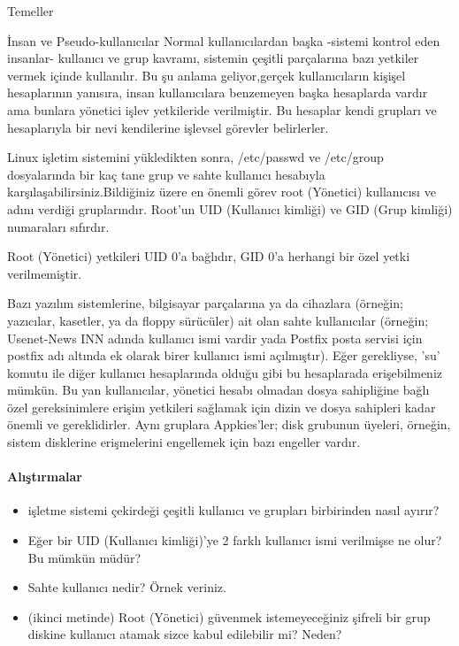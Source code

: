 \begin{section}{Temeller}
\begin{subsection}{İnsan ve Pseudo-kullanıcılar}
Normal kullanıcılardan başka -sistemi kontrol eden insanlar- kullanıcı ve grup kavramı, sistemin çeşitli parçalarına bazı yetkiler vermek içinde kullanılır. Bu şu anlama geliyor,gerçek kullanıcıların kişişel hesaplarının yanısıra, insan kullanıcılara benzemeyen başka hesaplarda vardır ama bunlara yönetici işlev yetkileride verilmiştir. Bu hesaplar kendi grupları ve hesaplarıyla bir nevi kendilerine işlevsel görevler belirlerler.

Linux işletim sistemini yükledikten sonra, /etc/passwd ve /etc/group dosyalarında bir kaç tane grup ve sahte kullanıcı hesabıyla karşılaşabilirsiniz.Bildiğiniz üzere en önemli görev root (Yönetici) kullanıcısı ve adını verdiği gruplarındır. Root'un UID (Kullanıcı kimliği) ve GID (Grup kimliği) numaraları sıfırdır.

Root (Yönetici) yetkileri UID 0'a bağlıdır, GID 0'a herhangi bir özel yetki verilmemiştir.

Bazı yazılım sistemlerine, bilgisayar parçalarına ya da cihazlara (örneğin; yazıcılar, kasetler, ya da floppy sürücüler) ait olan sahte kullanıcılar (örneğin; Usenet-News INN adında kullanıcı ismi vardir yada Postfix posta servisi için postfix adı altında ek olarak birer kullanıcı ismi açılmıştır). Eğer gerekliyse, 'su' komutu ile diğer kullanıcı hesaplarında olduğu gibi bu hesaplarada erişebilmeniz mümkün. Bu yan kullanıcılar, yönetici hesabı olmadan dosya sahipliğine bağlı özel gereksinimlere erişim yetkileri sağlamak için dizin ve dosya sahipleri kadar önemli ve gereklidirler. Aynı gruplara Appkies'ler; disk grubunun üyeleri, örneğin, sistem disklerine erişmelerini engellemek için bazı engeller vardır.
\end{subsection}
\paragraph{Alıştırmalar}{
\begin{itemize}
\item işletme sistemi çekirdeği çeşitli kullanıcı ve grupları birbirinden nasıl ayırır?
\item Eğer bir UID (Kullanıcı kimliği)'ye 2 farklı kullanıcı ismi verilmişse ne olur? Bu mümkün müdür?
\item Sahte kullanıcı nedir? Örnek veriniz.
\item (ikinci metinde) Root (Yönetici) güvenmek istemeyeceğiniz şifreli bir grup diskine kullanıcı atamak sizce kabul edilebilir mi? Neden?
\end{itemize}}
\end{section}
